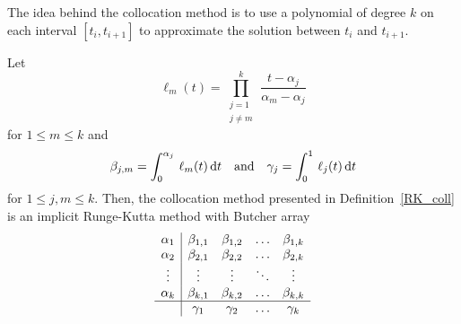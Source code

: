 The idea behind the collocation method is to use a polynomial of
degree $k$ on each interval $[t_i,t_{i+1}]$ to approximate the solution
between $t_i$ and $t_{i+1}$.

\begin{theorem}
Let
\[
\ell_m(t) = \prod_{\substack{j = 1 \\ j \neq m}}^k\,
\frac{t-\alpha_j}{\alpha_m-\alpha_j}
\]
for $1 \leq m \leq k$ and
\[
\beta_{j,m} = \int_0^{\alpha_j}\,\ell_m(t)\,\mathrm{d}t
\quad \text{and} \quad
\gamma_j = \int_0^1\,\ell_j(t)\,\mathrm{d}t
\]
for $1 \leq j,m \leq k$.  Then, the collocation method presented
in Definition~\ref{RK_coll} is an implicit Runge-Kutta method with
Butcher array
\[
\begin{array}{c|cccc}
\alpha_1 & \beta_{1,1} & \beta_{1,2} & \ldots & \beta_{1,k} \\
\alpha_2 & \beta_{2,1} & \beta_{2,2} & \ldots & \beta_{2,k} \\
\vdots & \vdots & \vdots & \ddots & \vdots \\
\alpha_k & \beta_{k,1} & \beta_{k,2} & \ldots & \beta_{k,k} \\
\hline
 & \gamma_1 & \gamma_2 & \ldots & \gamma_k
\end{array}
\]
\label{entries_Butcher}
\end{theorem}


